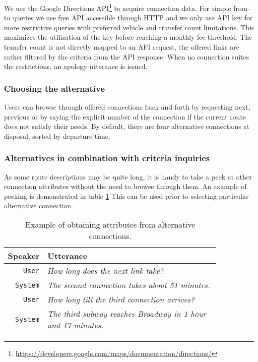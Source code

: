 We use the Google Directions API\footnote{\url{https://developers.google.com/maps/documentation/directions/}} to acquire connection data.
For simple from-to queries we use free API accessible through HTTP and we only use API key for more restrictive queries with preferred vehicle and transfer count limitations.
This maximizes the utilization of the key before reaching a monthly fee threshold. 
The transfer count is not directly mapped to an API request, the offered links are rather filtered by the criteria from the API response.
When no connection suites the restrictions, an apology utterance is issued.

\subsubsection{Choosing the alternative}

Users can browse through offered connections back and forth by requesting next, previous or by saying the explicit number of the connection if the current route does not satisfy their needs.
By default, there are four alternative connections at disposal, sorted by departure time.


\subsubsection{Alternatives in combination with criteria inquiries}

As some route descriptions may be quite long, it is handy to take a peek at other connection attributes without the need to browse through them. An example of peeking is demonstrated in table \ref{table:peek}
This can be used prior to selecting particular alternative connection.

\begin{table}[h]
\centering
\begin{tabular}{ | r | p{0.85\linewidth} | } \hline
	Speaker & Utterance \\ \hline
	\texttt{User} & \textit{How long does the next link take?} \\ \hline
	\texttt{System} & \textit{The second connection takes about 51 minutes.} \\ \hline
	\texttt{User} & \textit{How long till the third connection arrives?} \\ \hline
	\texttt{System} & \textit{The third subway reaches Broadway in 1 hour and 17 minutes.} \\ \hline
\end{tabular}
\caption[Alternative attribute peek]{Example of obtaining attributes from alternative connections.}
\label{table:peek}
\end{table}



